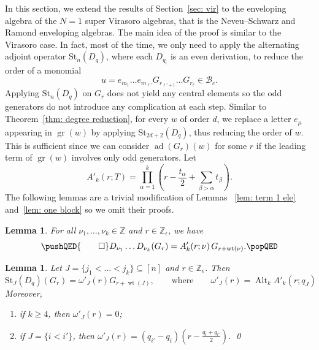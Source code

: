 \documentclass[12pt]{amsart}
\theoremstyle{plain}
\newtheorem{lemma}[theorem]{Lemma}
\theoremstyle{definition}
\numberwithin{equation}{theorem}
\newcommand{\ad}{\operatorname{ad}}
\newcommand{\Alt}{\operatorname{Alt}}
\newcommand{\gr}{\operatorname{gr}}
\newcommand{\ZZ}{\mathbb{Z}}
\newcommand{\calB}{\mathcal B}
\newcommand{\St}{\mathrm{St}}
\newcommand{\wt}{\operatorname{wt}}
\begin{document}
In this section, we extend the results of Section~\ref{sec: vir} to the enveloping algebra of the $N = 1$ super Virasoro algebras, that is the Neveu--Schwarz and Ramond enveloping algebras. The main idea of the proof is similar to the Virasoro case. In fact, most of the time, we only need to apply the alternating adjoint operator $\St_n(D_q)$, where each $D_{q_i}$ is an even derivation, to reduce the order of a monomial 
\[u = e_{m_1} \dots e_{m_{\ell'}} G_{r_{\ell'+1}} \dots G_{r_\ell} \in \calB_c.
\]
Applying $\St_n(D_q)$ on $G_r$ does not yield any central elements so the odd generators do not introduce any complication at each step. Similar to Theorem~\ref{thm: degree reduction}, for every $w$ of order $d$, we replace a letter $e_{\mu}$ appearing in $\gr(w)$ by applying $\St_{2d+2}(D_q)$, thus reducing the order of $w$. This is sufficient since we can consider $\ad(G_r)(w)$ for some $r$ if the leading term of $\gr(w)$ involves only odd generators. Let 
\begin{equation}\label{def: A'}
    A'_k(r; T) = \prod_{\alpha=1}^k (r-\frac{t_\alpha}{2} + \sum_{\beta > \alpha} t_\beta).
\end{equation}
The following lemmas are a trivial modification of Lemmas ~\ref{lem: term 1 ele} and~\ref{lem: one block} so we omit their proofs.
\begin{lemma}\label{lem: NSR term 1 ele}
    For all $\nu_1, \dots, \nu_k \in \ZZ$ and $r \in \ZZ_\epsilon$, we have 
    \begin{equation*}
    \pushQED{\qed} 
        D_{\nu_1} \dots D_{\nu_k} (G_r) = A'_k(r; \nu) \, G_{r + \wt(\nu)}. \qedhere
    \popQED
    \end{equation*}
\end{lemma} 
\begin{lemma}\label{lem: NSR one block}
    Let $J = \{j_1 < \dots < j_k\} \subseteq [n]$ and $r \in \ZZ_\epsilon$. Then 
    \begin{equation}\label{eq: NSR std ad 1}
        \St_J(D_q)(G_r) = \omega'_J (r) G_{r+\wt(J)}, \qquad \text{where} \qquad \omega'_J (r) = \Alt_k A'_k(r; q_J)
    \end{equation}
    Moreover,
    \begin{enumerate}[label=\textup{(\arabic*)}]
        \item if $k \geq 4$, then $\omega'_J (r) = 0$;
        \item if $J = \{i < i'\}$, then $\omega'_J(r) =(q_{i'} - q_i) (r - \frac{q_i+ q_{i'}}{2})$. \qed
    \end{enumerate} 
\end{lemma}
\end{document}
